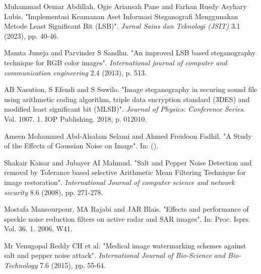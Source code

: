 \documentclass{ittelkom}
\begin{document}
\begin{thebibliography}{99}
    Muhammad Oemar Abdillah, Ogie Ariansah Pane and Farhan Rusdy Asyhary Lubis. "Implementasi Keamanan Aset Informasi Steganografi Menggunakan Metode Least Significant Bit (LSB)". \textit{Jurnal Sains dan Teknologi (JSIT)} 3.1 (2023), pp. 40-46.

    Mamta Juneja and Parvinder S Sandhu. "An improved LSB based steganography technique for RGB color images". \textit{International journal of computer and communication engineering} 2.4 (2013), p. 513.

    AB Nasution, S Efendi and S Suwilo. "Image steganography in securing sound file using arithmetic coding algorithm, triple data encryption standard (3DES) and modified least significant bit (MLSB)". \textit{Journal of Physics: Conference Series}. Vol. 1007. 1. IOP Publishing. 2018, p. 012010.

    Ameen Mohammed Abd-Alsalam Selami and Ahmed Freidoon Fadhil. "A Study of the Effects of Gaussian Noise on Image". In: (). %

    Shakair Kaisar and Jubayer AI Mahmud. "Salt and Pepper Noise Detection and removal by Tolerance based selective Arithmetic Mean Filtering Technique for image restoration". \textit{International Journal of computer science and network security} 8.6 (2008), pp. 271-278.

    Mostafa Mansourpour, MA Rajabi and JAR Blais. "Effects and performance of speckle noise reduction filters on active radar and SAR images". In: Proc. Isprs. Vol. 36. 1. 2006, W41. %

    Mr Venugopal Reddy CH et al. "Medical image watermarking schemes against salt and pepper noise attack". \textit{International Journal of Bio-Science and Bio-Technology} 7.6 (2015), pp. 55-64.

\end{thebibliography}

\end{document}
